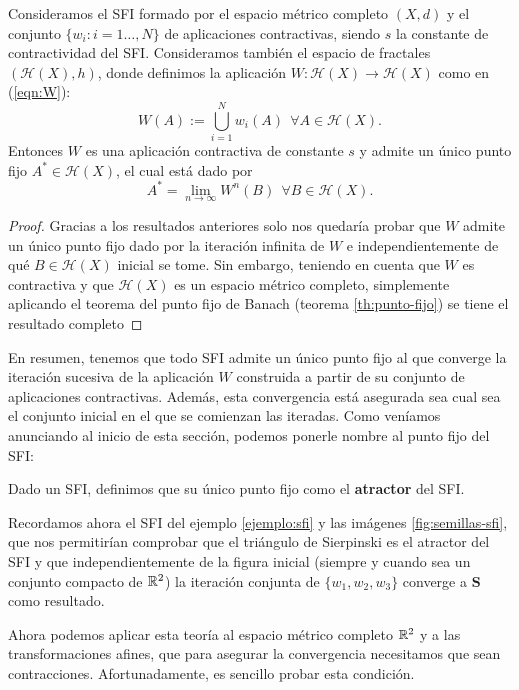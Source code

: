 \begin{teorema}
    Consideramos el SFI formado por el espacio métrico completo $(X,d)$ y el conjunto $\{w_i:i=1\dots, N\}$ de aplicaciones contractivas, siendo $s$ la constante de contractividad del SFI. Consideramos también el espacio de fractales $(\mathcal{H}(X),h)$, donde definimos la aplicación $W:\mathcal{H}(X)\longrightarrow\mathcal{H}(X)$ como en (\ref{eqn:W}):
    $$
    W(A) := \bigcup_{i=1}^N w_i(A) \ \ \forall A\in\mathcal{H}(X).
    $$
    Entonces $W$ es una aplicación contractiva de constante $s$ y admite un único punto fijo $A^*\in\mathcal{H}(X)$, el cual está dado por 
    $$
    A^*=\lim_{n\rightarrow\infty} W^n(B) \ \ \forall B\in\mathcal{H}(X).
    $$

\end{teorema}
\begin{proof}
    Gracias a los resultados anteriores solo nos quedaría probar que $W$ admite un único punto fijo dado por la iteración infinita de $W$ e independientemente de qué $B\in\mathcal{H}(X)$ inicial se tome. Sin embargo, teniendo en cuenta que $W$ es contractiva y que $\mathcal{H}(X)$ es un espacio métrico completo, simplemente aplicando el teorema del punto fijo de Banach (teorema \ref{th:punto-fijo}) se tiene el resultado completo
\end{proof}

En resumen, tenemos que todo SFI admite un único punto fijo al que converge la iteración sucesiva de la aplicación $W$ construida a partir de su conjunto de aplicaciones contractivas. Además, esta convergencia está asegurada sea cual sea el conjunto inicial en el que se comienzan las iteradas. Como veníamos anunciando al inicio de esta sección, podemos ponerle nombre al punto fijo del SFI:

\begin{definicion}[Atractor]
    Dado un SFI, definimos que su único punto fijo como el \textbf{atractor} del SFI.    
\end{definicion}

Recordamos ahora el SFI del ejemplo \ref{ejemplo:sfi} y las imágenes \ref{fig:semillas-sfi}, que nos permitirían comprobar que el triángulo de Sierpinski es el atractor del SFI y que independientemente de la figura inicial (siempre y cuando sea un conjunto compacto de $\mathbb{R}^2$) la iteración conjunta de $\{w_1,w_2,w_3\}$ converge a $\mathbf{S}$ como resultado.

Ahora podemos aplicar esta teoría al espacio métrico completo $\mathbb{R}^2$ y a las transformaciones afines, que para asegurar la convergencia necesitamos que sean contracciones. Afortunadamente, es sencillo probar esta condición.

